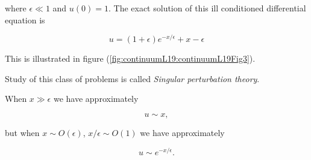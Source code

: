 where $\epsilon \ll 1$ and $u(0) = 1$.  The exact solution of this ill conditioned differential equation is

\begin{equation}\label{eqn:continuumL19:670}
u = (1 + \epsilon) e^{-x/\epsilon} + x - \epsilon
\end{equation}

This is illustrated in figure (\ref{fig:continuumL19:continuumL19Fig3}).


Study of this class of problems is called \textit{Singular perturbation theory}.

When $x \gg \epsilon$ we have approximately

\begin{equation}\label{eqn:continuumL19:690}
u \sim x,
\end{equation}

but when $x \sim O(\epsilon)$, $x/\epsilon \sim O(1)$ we have approximately

\begin{equation}\label{eqn:continuumL19:710}
u \sim e^{-x/\epsilon}.
\end{equation}

\EndArticle
